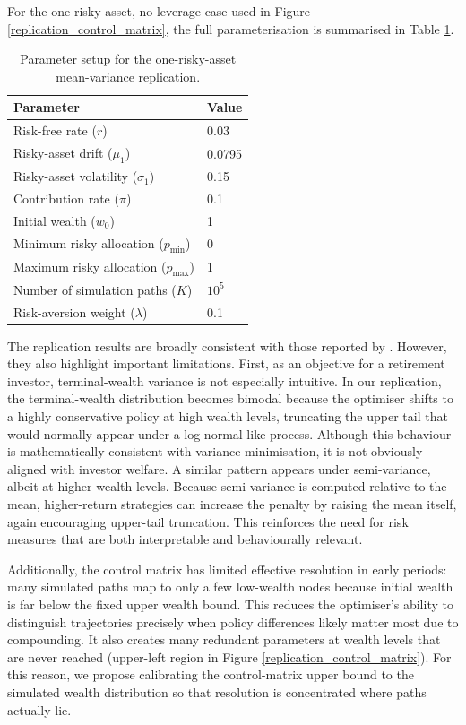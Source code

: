 \documentclass[11pt]{article}
\begin{document}
For the one-risky-asset, no-leverage case used in Figure \ref{replication_control_matrix}, the full parameterisation is summarised in Table \ref{tab:replication_one_asset_params}.

\begin{table}[h!]
    \centering
    \caption{Parameter setup for the one-risky-asset mean-variance replication.}
    \label{tab:replication_one_asset_params}
    \begin{tabular}{ll}
        \toprule
        Parameter & Value \\
        \midrule
        Risk-free rate ($r$) & 0.03 \\
        Risky-asset drift ($\mu_1$) & 0.0795 \\
        Risky-asset volatility ($\sigma_1$) & 0.15 \\
        Contribution rate ($\pi$) & 0.1 \\
        Initial wealth ($w_0$) & 1 \\
        Minimum risky allocation ($p_{\min}$) & 0 \\
        Maximum risky allocation ($p_{\max}$) & 1 \\
        Number of simulation paths ($K$) & $10^5$ \\
        Risk-aversion weight ($\lambda$) & 0.1 \\
        \bottomrule
    \end{tabular}
\end{table}

The replication results are broadly consistent with those reported by \textcite{Makinen2024}. However, they also highlight important limitations. First, as an objective for a retirement investor, terminal-wealth variance is not especially intuitive. In our replication, the terminal-wealth distribution becomes bimodal because the optimiser shifts to a highly conservative policy at high wealth levels, truncating the upper tail that would normally appear under a log-normal-like process. Although this behaviour is mathematically consistent with variance minimisation, it is not obviously aligned with investor welfare. A similar pattern appears under semi-variance, albeit at higher wealth levels. Because semi-variance is computed relative to the mean, higher-return strategies can increase the penalty by raising the mean itself, again encouraging upper-tail truncation. This reinforces the need for risk measures that are both interpretable and behaviourally relevant.

Additionally, the control matrix has limited effective resolution in early periods: many simulated paths map to only a few low-wealth nodes because initial wealth is far below the fixed upper wealth bound. This reduces the optimiser's ability to distinguish trajectories precisely when policy differences likely matter most due to compounding. It also creates many redundant parameters at wealth levels that are never reached (upper-left region in Figure \ref{replication_control_matrix}). For this reason, we propose calibrating the control-matrix upper bound to the simulated wealth distribution so that resolution is concentrated where paths actually lie.
\end{document}
